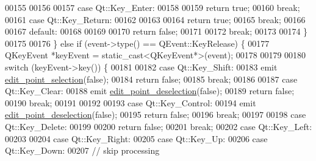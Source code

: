 \begin{DoxyCode}
00155 
00156 
00157             \textcolor{keywordflow}{case} Qt::Key\_Enter:
00158 
00159                  \textcolor{keywordflow}{return} \textcolor{keyword}{true};
00160                 \textcolor{keywordflow}{break};
00161             \textcolor{keywordflow}{case} Qt::Key\_Return:
00162 
00163 
00164                  \textcolor{keywordflow}{return} \textcolor{keyword}{true};
00165                 \textcolor{keywordflow}{break};
00166 
00167             \textcolor{keywordflow}{default}:
00168 
00169 
00170                 \textcolor{keywordflow}{return} \textcolor{keyword}{false};
00171 
00172                \textcolor{keywordflow}{break};
00173 
00174             \}
00175 
00176         \} \textcolor{keywordflow}{else}  \textcolor{keywordflow}{if} (event->type() == QEvent::KeyRelease) \{
00177             QKeyEvent *keyEvent = \textcolor{keyword}{static\_cast<}QKeyEvent*\textcolor{keyword}{>}(event);
00178 
00179 
00180             \textcolor{keywordflow}{switch} (keyEvent->key()) \{
00181 
00182             \textcolor{keywordflow}{case} Qt::Key\_Shift:
00183                    emit \hyperlink{a00004_a9aa2af0c329358fd96f7fb6b7f02bfe1}{edit\_point\_selection}(\textcolor{keyword}{false});
00184                   \textcolor{keywordflow}{return} \textcolor{keyword}{false};
00185                  \textcolor{keywordflow}{break};
00186 
00187             \textcolor{keywordflow}{case} Qt::Key\_Clear:
00188                     emit \hyperlink{a00004_a2b9629d20c2b97c01bf8486c89fd0148}{edit\_point\_deselection}(\textcolor{keyword}{false});
00189                     \textcolor{keywordflow}{return} \textcolor{keyword}{false};
00190                      \textcolor{keywordflow}{break};
00191 
00192 
00193             \textcolor{keywordflow}{case} Qt::Key\_Control:
00194                     emit \hyperlink{a00004_a2b9629d20c2b97c01bf8486c89fd0148}{edit\_point\_deselection}(\textcolor{keyword}{false});
00195                     \textcolor{keywordflow}{return} \textcolor{keyword}{false};
00196                      \textcolor{keywordflow}{break};
00197 
00198             \textcolor{keywordflow}{case} Qt::Key\_Delete:
00199 
00200                     \textcolor{keywordflow}{return} \textcolor{keyword}{false};
00201                      \textcolor{keywordflow}{break};
00202             \textcolor{keywordflow}{case} Qt::Key\_Left:
00203 
00204             \textcolor{keywordflow}{case} Qt::Key\_Right:
00205             \textcolor{keywordflow}{case} Qt::Key\_Up:
00206             \textcolor{keywordflow}{case} Qt::Key\_Down:
00207                 \textcolor{comment}{// skip processing}

\end{DoxyCode}
